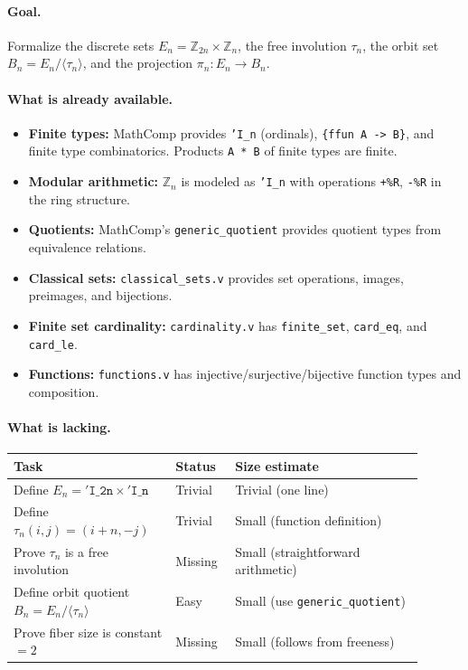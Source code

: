 \documentclass[11pt,a4paper]{article}
\theoremstyle{definition}
\theoremstyle{remark}
\begin{document}
\paragraph{Goal.}
Formalize the discrete sets \(E_n=\mathbb{Z}_{2n}\times\mathbb{Z}_n\), the free involution \(\tau_n\), the orbit set \(B_n=E_n/\langle\tau_n\rangle\), and the projection \(\pi_n:E_n\to B_n\).

\paragraph{What is already available.}
\begin{itemize}
  \item \textbf{Finite types:} MathComp provides \texttt{'I\_n} (ordinals), \texttt{\{ffun A -> B\}}, and finite type combinatorics. Products \texttt{A * B} of finite types are finite.
  \item \textbf{Modular arithmetic:} \(\mathbb{Z}_n\) is modeled as \texttt{'I\_n} with operations \texttt{+\%R}, \texttt{-\%R} in the ring structure.
  \item \textbf{Quotients:} MathComp's \texttt{generic\_quotient} provides quotient types from equivalence relations.
  \item \textbf{Classical sets:} \texttt{classical\_sets.v} provides set operations, images, preimages, and bijections.
  \item \textbf{Finite set cardinality:} \texttt{cardinality.v} has \texttt{finite\_set}, \texttt{card\_eq}, and \texttt{card\_le}.
  \item \textbf{Functions:} \texttt{functions.v} has injective/surjective/bijective function types and composition.
\end{itemize}

\paragraph{What is lacking.}
\begin{center}
\begin{tabular}{p{0.35\linewidth} p{0.13\linewidth} p{0.42\linewidth}}
\hline
\textbf{Task} & \textbf{Status} & \textbf{Size estimate}\\
\hline
Define \(E_n=\mathtt{'I\_{2n}}\times\mathtt{'I\_n}\) & Trivial & Trivial (one line)\\
Define \(\tau_n(i,j)=(i+n,-j)\) & Trivial & Small (function definition)\\
Prove \(\tau_n\) is a free involution & Missing & Small (straightforward arithmetic)\\
Define orbit quotient \(B_n=E_n/\langle\tau_n\rangle\) & Easy & Small (use \texttt{generic\_quotient})\\
Prove fiber size is constant \(=2\) & Missing & Small (follows from freeness)\\
\hline
\end{tabular}
\end{center}
\end{document}

